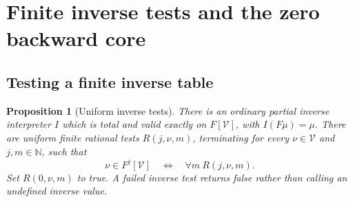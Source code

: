 \documentclass[11pt]{article}
\newtheorem{proposition}[theorem]{Proposition}
\theoremstyle{definition}
\theoremstyle{remark}
\newcommand{\N}{\mathbb N}
\newcommand{\V}{\mathcal V}
\begin{document}
\section{Finite inverse tests and the zero backward core}
\label{sec:core}

\subsection{Testing a finite inverse table}

\begin{proposition}[Uniform inverse tests]
\label{prop:inverse-tests}
There is an ordinary partial inverse interpreter $I$ which is total
and valid exactly on $F[\V]$, with $I(F\mu)=\mu$.  There are uniform
finite rational tests $R(j,\nu,m)$, terminating for every
$\nu\in\V$ and $j,m\in\N$, such that
\begin{equation}
  \nu\in F^j[\V]\quad\Longleftrightarrow\quad
       \forall m\ R(j,\nu,m).
  \label{eq:image-tests}
\end{equation}
Set $R(0,\nu,m)$ to true.  A failed inverse test returns false rather
than calling an undefined inverse value.
\end{proposition}
\end{document}
